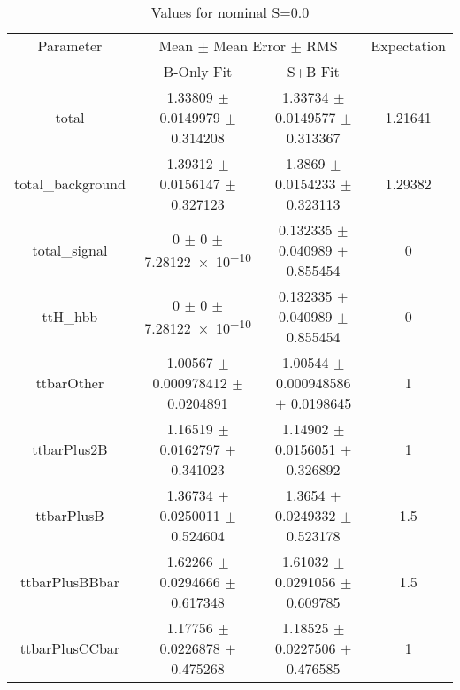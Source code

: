 \begin{table}
\centering
\caption{Values for nominal S=0.0}
\begin{tabular}{cccc}
\toprule
Parameter & \multicolumn{2}{c}{Mean $\pm$ Mean Error $\pm$ RMS} & Expectation\\
 & B-Only Fit & S+B Fit & \\
\midrule
total & \num{1.33809} $\pm$ \num{0.0149979} $\pm$ \num{0.314208} & \num{1.33734} $\pm$ \num{0.0149577} $\pm$ \num{0.313367} & \num{1.21641}\\
total\_background & \num{1.39312} $\pm$ \num{0.0156147} $\pm$ \num{0.327123} & \num{1.3869} $\pm$ \num{0.0154233} $\pm$ \num{0.323113} & \num{1.29382}\\
total\_signal & \num{0} $\pm$ \num{0} $\pm$ \num{7.28122e-10} & \num{0.132335} $\pm$ \num{0.040989} $\pm$ \num{0.855454} & \num{0}\\
ttH\_hbb & \num{0} $\pm$ \num{0} $\pm$ \num{7.28122e-10} & \num{0.132335} $\pm$ \num{0.040989} $\pm$ \num{0.855454} & \num{0}\\
ttbarOther & \num{1.00567} $\pm$ \num{0.000978412} $\pm$ \num{0.0204891} & \num{1.00544} $\pm$ \num{0.000948586} $\pm$ \num{0.0198645} & \num{1}\\
ttbarPlus2B & \num{1.16519} $\pm$ \num{0.0162797} $\pm$ \num{0.341023} & \num{1.14902} $\pm$ \num{0.0156051} $\pm$ \num{0.326892} & \num{1}\\
ttbarPlusB & \num{1.36734} $\pm$ \num{0.0250011} $\pm$ \num{0.524604} & \num{1.3654} $\pm$ \num{0.0249332} $\pm$ \num{0.523178} & \num{1.5}\\
ttbarPlusBBbar & \num{1.62266} $\pm$ \num{0.0294666} $\pm$ \num{0.617348} & \num{1.61032} $\pm$ \num{0.0291056} $\pm$ \num{0.609785} & \num{1.5}\\
ttbarPlusCCbar & \num{1.17756} $\pm$ \num{0.0226878} $\pm$ \num{0.475268} & \num{1.18525} $\pm$ \num{0.0227506} $\pm$ \num{0.476585} & \num{1}\\
\bottomrule
\end{tabular}
\end{table}